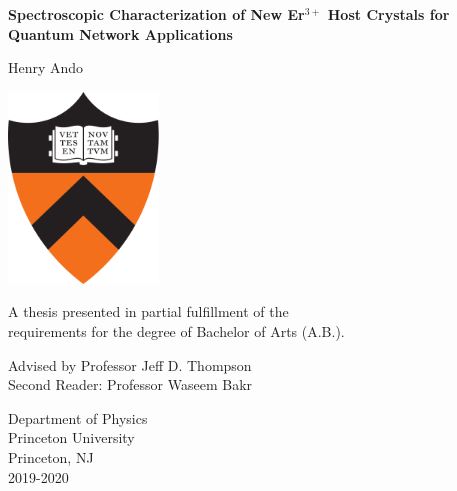 \documentclass[12pt]{report}
\newcommand{\erbium}[1][ ]{Er$^{3+}$#1}
\begin{document}
\setcounter{page}{1}

\begin{titlepage}
  \singlespacing
  \begin{center}
    \vspace*{5mm}
    \Large{\textbf{Spectroscopic Characterization of New \erbium Host Crystals for Quantum Network Applications}}
    
    \vspace{0.5cm}
    
    \Large{Henry Ando}
    
    \vfill
    \includegraphics[height=2in]{Figures/Princeton.png}
    \vfill
    
    \normalsize{A thesis presented in partial fulfillment of the\\requirements for the degree of Bachelor of Arts (A.B.).}
    
    \vspace{0.8cm}
    
    \normalsize{Advised by Professor Jeff D. Thompson} \\
    \normalsize{Second Reader: Professor Waseem Bakr}
    
    \vspace{0.8cm}
    
    \normalsize{Department of Physics\\
      Princeton University\\
      Princeton, NJ\\
      2019-2020}
  \end{center}
\end{titlepage}
\end{document}
